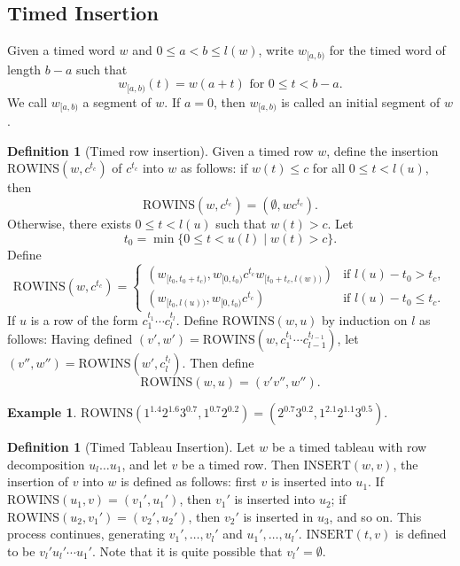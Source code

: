 \documentclass[12pt]{amsart}
\theoremstyle{definition}
\newtheorem{definition}[theorem]{Definition}
\newtheorem{example}[theorem]{Example}
\newcommand{\rowins}{\mathrm{ROWINS}}
\newcommand{\ins}{\mathrm{INSERT}}
\begin{document}
\subsection{Timed Insertion}
\label{sec:timed-insertion}
Given a timed word $w$ and $0\leq a < b \leq l(w)$, write $w_{[a, b)}$ for the timed word of length $b-a$ such that
\begin{displaymath}
  w_{[a, b)}(t) = w(a+ t) \text{ for } 0\leq t<b-a.
\end{displaymath}
We call $w_{[a,b)}$ a segment of $w$.
If $a=0$, then $w_{[a,b)}$ is called an initial segment of $w$.
\begin{definition}[Timed row insertion]
  \label{definition:timed-row-insertion}
  Given a timed row $w$, define the insertion $\rowins(w, c^{t_c})$ of $c^{t_c}$ into $w$ as follows: if $w(t)\leq c$ for all $0\leq t < l(u)$, then
  \begin{displaymath}
    \rowins(w, c^{t_c}) = (\emptyset, wc^{t_c}).
  \end{displaymath}
  Otherwise, there exists $0\leq t < l(u)$ such that $w(t)>c$.
  Let
  \begin{displaymath}
    t_0 = \min\{0\leq t< u(l)\mid w(t)> c\}.
  \end{displaymath}
  Define
  \begin{displaymath}
    \rowins(w, c^{t_c}) =
    \begin{cases}
      (w_{[t_0, t_0+t_c)}, w_{[0, t_0)}c^{t_c} w_{[t_0+t_c, l(w))}) & \text{if } l(u) - t_0 > t_c,\\
      (w_{[t_0, l(u))}, w_{[0, t_0)} c^{t_c}) & \text{if } l(u) - t_0 \leq t_c.
    \end{cases}
  \end{displaymath}
  If $u$ is a row of the form $c_1^{t_1}\dotsb c_l^{t_l}$.
  Define $\rowins(w,u)$ by induction on $l$ as follows:
  Having defined $(v',w')=\rowins(w,c_1^{t_1}\dotsb c_{l-1}^{t_{l-1}})$,
  let $(v'',w'')=\rowins(w',c_l^{t_l})$.
  Then define
  \begin{displaymath}
    \rowins(w,u) = (v'v'', w'').
  \end{displaymath}
\end{definition}
\begin{example}
  \label{example:timed-row-ins}
  $\rowins(1^{1.4}2^{1.6}3^{0.7},1^{0.7}2^{0.2})=(2^{0.7}3^{0.2},1^{2.1}2^{1.1}3^{0.5})$.
\end{example}
\begin{definition}
  [Timed Tableau Insertion]
  Let $w$ be a timed tableau with row decomposition $u_l\dotsc u_1$, and let $v$ be a timed row.
  Then $\ins(w, v)$, the insertion of $v$ into $w$ is defined as follows:
  first $v$ is inserted into $u_1$.
  If $\rowins(u_1,v)=(v_1',u_1')$, then $v_1'$ is inserted into $u_2$; if $\rowins(u_2,v_1')=(v_2',u_2')$, then $v_2'$ is inserted in $u_3$, and so on.
  This process continues, generating $v_1',\dotsc,v_l'$ and $u_1',\dotsc,u_l'$.
  $\ins(t,v)$ is defined to be $v_l'u_l'\dotsb u_1'$.
  Note that it is quite possible that $v_l'=\emptyset$.
\end{definition}
\end{document}
